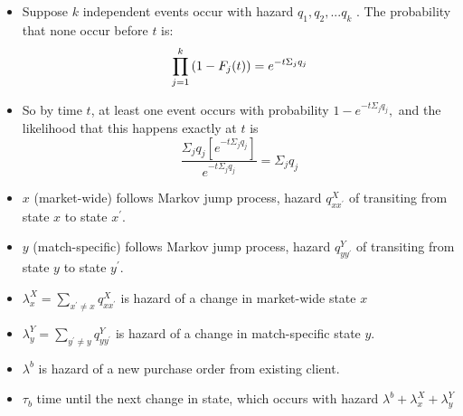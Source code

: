 \documentclass[notes=show]{beamer}
\begin{document}
\begin{frame}%


\begin{itemize}
\item Suppose $k$ independent events occur with hazard $q_{1},q_{2},...q_{k}$%
. The probability that none occur before $t$ is: 
\[
\mathop{\displaystyle \prod }\limits_{j=1}^{k}\left( 1-F_{j}(t)\right) =e^{-t\Sigma _{j}q_{j}} 
\]

\item So by time $t$, at least one event occurs with probability $%
1-e^{-t\Sigma _{j}q_{j}},$ and the likelihood that this happens exactly at $%
t $ is%
\[
\frac{\Sigma _{j}q_{j}\left[ e^{-t\Sigma _{j}q_{j}}\right] }{e^{-t\Sigma
_{j}q_{j}}}=\Sigma _{j}q_{j} 
\]
\end{itemize}

\end{frame}%
\begin{frame}%

\label{pihat_derivation}



\begin{itemize}
\item $x$ (market-wide) follows Markov jump process, hazard $q_{xx^{\prime
}}^{X}$ of transiting from state $x$ to state $x^{\prime }.$

\item $y$ (match-specific) follows Markov jump process, hazard $%
q_{yy^{\prime }}^{Y}$ of transiting from state $y$ to state $y^{\prime }$.

\item $\lambda _{x}^{X}=\sum_{x^{\prime }\neq x}q_{xx^{\prime }}^{X}$ is
hazard of a change in market-wide state $x$

\item $\lambda _{y}^{Y}=\sum_{y^{\prime }\neq y}q_{yy^{\prime }}^{Y}$ is
hazard of a change in match-specific state $y$.

\item $\lambda ^{b}$ is hazard of a new purchase order from existing client.

\item $\tau _{b}$ time until the next change in state, which occurs with
hazard $\lambda ^{b}+\lambda _{x}^{X}+\lambda _{y}^{Y}$
\end{itemize}

\end{frame}%
\end{document}
